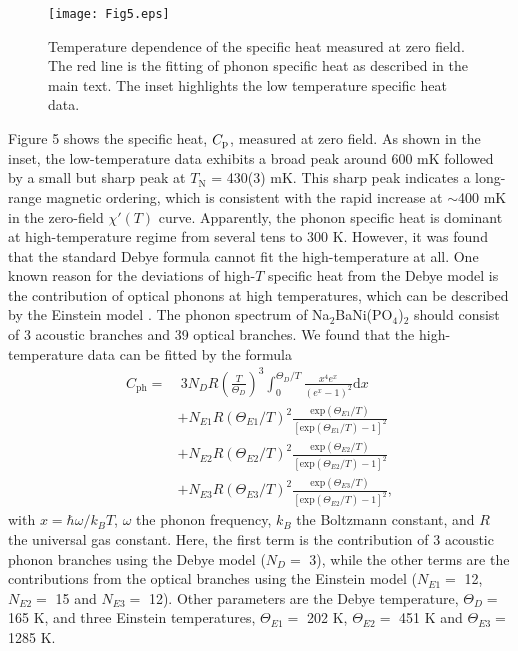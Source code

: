 \documentclass[aps,twocolumn,superscriptaddress,showpacs]{revtex4-1}
\begin{document}
\begin{figure}
\texttt{[image: Fig5.eps]}
\caption{Temperature dependence of the specific heat measured at zero field. The red line is the fitting of phonon specific heat as described in the main text. The inset highlights the low temperature specific heat data.}
\label{Cp}
\end{figure}

Figure 5 shows the specific heat, $C\rm_{p}$, measured at zero field. As shown in the inset, the low-temperature data exhibits a broad peak around 600 mK followed by a small but sharp peak at $T_{\text{N}}$ = 430(3) mK. This sharp peak indicates a long-range magnetic ordering, which is consistent with the rapid increase at $\sim$400 mK in the zero-field $\chi'(T)$ curve. Apparently, the phonon specific heat is dominant at high-temperature regime from several tens to 300 K. However, it was found that the standard Debye formula cannot fit the high-temperature at all. One known reason for the deviations of high-$T$ specific heat from the Debye model is the contribution of optical phonons at high temperatures, which can be described by the Einstein model \cite{Song_CFO, Svoboda, Hemberger, Janiceka}. The phonon spectrum of Na$_2$BaNi(PO$_4$)$_2$ should consist of 3 acoustic branches and 39 optical branches. We found that the high-temperature data can be fitted by the formula
\begin{equation}\label{eq:eps}
\begin{split}
C_{\text{ph}} = & \ 3N_D R \left(\frac{T}{\Theta_D}\right)^3 \int_0^{\Theta_D /T} \frac{x^4e^x}{(e^x-1)^2}\mathrm{d}x \\
& + N_{E1} R \left(\Theta_{E1}/T\right)^2 \frac{\mathrm{exp}(\Theta_{E1}/T)}{[\mathrm{exp}(\Theta_{E1}/T)-1]^2} \\
& + N_{E2} R \left(\Theta_{E2}/T\right)^2 \frac{\mathrm{exp}(\Theta_{E2}/T)}{[\mathrm{exp}(\Theta_{E2}/T)-1]^2} \\
& + N_{E3} R \left(\Theta_{E3}/T\right)^2 \frac{\mathrm{exp}(\Theta_{E3}/T)}{[\mathrm{exp}(\Theta_{E2}/T)-1]^2},
\end{split}
\end{equation}
with $x = \hbar\omega/k_BT$, $\omega$ the phonon frequency, $k_B$ the Boltzmann constant, and $R$ the universal gas constant. Here, the first term is the contribution of 3 acoustic phonon branches using the Debye model ($N_D =$ 3), while the other terms are the contributions from the optical branches using the Einstein model ($N_{E1} =$ 12, $N_{E2} =$ 15 and $N_{E3} =$ 12). Other parameters are the Debye temperature, $\Theta_D =$ 165 K, and three Einstein temperatures, $\Theta_{E1} =$ 202 K, $\Theta_{E2} =$ 451 K and $\Theta_{E3} =$ 1285 K.
\end{document}
